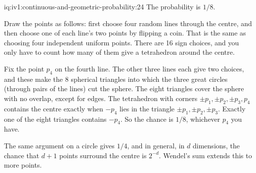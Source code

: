 \enlargethispage{-3\baselineskip}%
\begin{solution}{iq:iv1:continuous-and-geometric-probability:24}
The probability is $1/8$.

Draw the points as follows: first choose four random lines through the centre, and then choose one of each line's two points by flipping a coin. That is the same as choosing four independent uniform points. There are 16 sign choices, and you only have to count how many of them give a tetrahedron around the centre.

Fix the point $p_4$ on the fourth line. The other three lines each give two choices, and these make the 8 spherical triangles into which the three great circles (through pairs of the lines) cut the sphere. The eight triangles cover the sphere with no overlap, except for edges. The tetrahedron with corners $\pm p_1, \pm p_2, \pm p_3, p_4$ contains the centre exactly when $-p_4$ lies in the triangle $\pm p_1, \pm p_2, \pm p_3$. Exactly one of the eight triangles contains $-p_4$. So the chance is $1/8$, whichever $p_4$ you have.

The same argument on a circle gives $1/4$, and in general, in $d$ dimensions, the chance that $d + 1$ points surround the centre is $2^{-d}$. Wendel's sum extends this to more points.

\end{solution}

